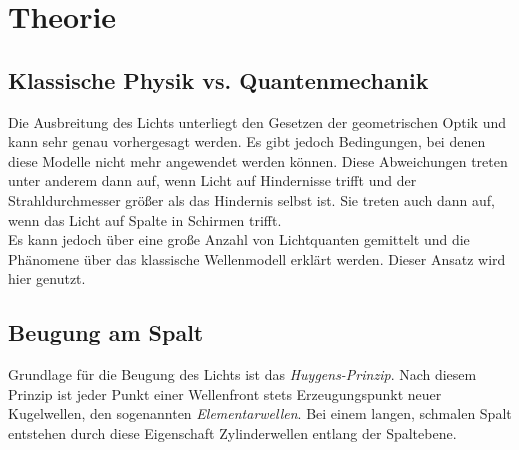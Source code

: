 \section{Theorie}
\label{sec:Theorie}

\subsection{Klassische Physik vs. Quantenmechanik}
Die Ausbreitung des Lichts unterliegt den Gesetzen der geometrischen Optik und kann sehr genau vorhergesagt werden.
Es gibt jedoch Bedingungen, bei denen diese Modelle nicht mehr angewendet werden können.
Diese Abweichungen treten unter anderem dann auf, wenn Licht auf Hindernisse trifft und der Strahldurchmesser größer als das Hindernis selbst ist.
Sie treten auch dann auf, wenn das Licht auf Spalte in Schirmen trifft.\\
Es kann jedoch über eine große Anzahl von Lichtquanten gemittelt und die Phänomene über das klassische Wellenmodell erklärt werden.
Dieser Ansatz wird hier genutzt.\\

\subsection{Beugung am Spalt}
Grundlage für die Beugung des Lichts ist das \textit{Huygens-Prinzip}.
Nach diesem Prinzip ist jeder Punkt einer Wellenfront stets Erzeugungspunkt neuer Kugelwellen, den sogenannten \textit{Elementarwellen}.
Bei einem langen, schmalen Spalt entstehen durch diese Eigenschaft Zylinderwellen entlang der Spaltebene.


